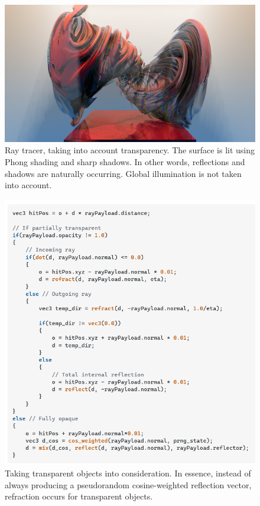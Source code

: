 \documentclass[12pt]{article}
\begin{document}
\begin{figure} 
\centering
  \includegraphics[width = 6 in]{v_rt_reflect.png}
  \caption{ Ray tracer, taking into account transparency.
The surface is lit using Phong shading and sharp shadows.
In other words, reflections and shadows are naturally occurring.
Global illumination is not taken into account.
}
\end{figure}


\begin{figure} 
\centering
  \includegraphics[width = 6 in]{code.png}
  \caption{ Taking transparent objects into consideration.
In essence, instead of always producing a pseudorandom cosine-weighted reflection vector, refraction occurs for transparent objects.
}
\end{figure}
\end{document}
